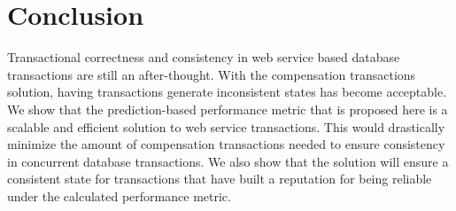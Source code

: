 \documentclass[conference]{IEEEtran}
\begin{document}

%



\section*{Conclusion}
Transactional correctness and consistency in web service based database transactions are still an after-thought. With the compensation transactions solution, having transactions generate inconsistent states has become acceptable. We show that the prediction-based performance metric that is proposed here is a scalable and efficient solution to web service transactions. This would drastically minimize the amount of compensation transactions needed to ensure consistency in concurrent database transactions. We also show that the solution will ensure a consistent state for transactions that have built a reputation for being reliable under the calculated performance metric.

\end{document}
